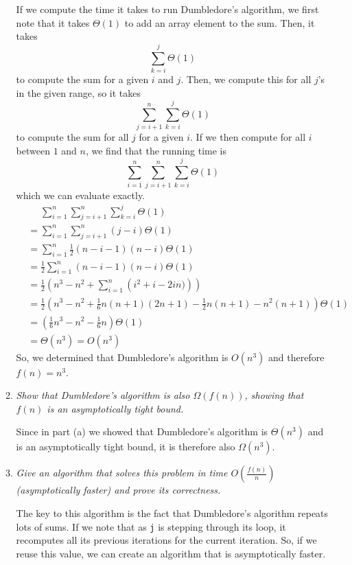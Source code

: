 \documentclass[12pt]{article}
\begin{document}
\begin{enumerate}
\begin{enumerate}
    If we compute the time it takes to run Dumbledore's algorithm, we first note that it takes $\Theta(1)$ to add an array element to the sum. Then, it takes
    \[
    \sum_{k=i}^{j} \Theta(1)
    \]
    to compute the sum for a given $i$ and $j$. Then, we compute this for all $j$'s in the given range, so it takes
    \[
    \sum_{j=i+1}^{n} \sum_{k=i}^{j} \Theta(1)
    \]
    to compute the sum for all $j$ for a given $i$. If we then compute for all $i$ between $1$ and $n$, we find that the running time is
    \[
    \sum_{i=1}^n \sum_{j=i+1}^{n} \sum_{k=i}^{j} \Theta(1)
    \]
    which we can evaluate exactly.
    \begin{align*}
        &\hspace{16pt}\sum_{i=1}^n \sum_{j=i+1}^{n} \sum_{k=i}^{j} \Theta(1)\\
        &= \sum_{i=1}^n \sum_{j=i+1}^{n} (j-i)\Theta(1)\\
        &= \sum_{i=1}^n \frac{1}{2}(n-i-1)(n-i) \Theta(1)\\
        &= \frac{1}{2} \sum_{i=1}^n (n-i-1)(n-i) \Theta(1)\\
        &= \frac{1}{2} \left( n^3 - n^2 + \sum_{i=1}^n \left(i^2+i-2in)\right)\right)\\
        &= \frac{1}{2} \left( n^3 - n^2 + \frac{1}{6}n(n+1)(2n+1)-\frac{1}{2}n(n+1) - n^2(n+1)\right) \Theta(1)\\
        &= \left(\frac{1}{6}n^3-n^2-\frac{1}{6}n\right)\Theta(1)\\
        &= \Theta(n^3) = O(n^3)
    \end{align*}
    So, we determined that Dumbledore's algorithm is $O(n^3)$ and therefore $\boxed{f(n)=n^3}$.
    
    
	\item \textit{Show that Dumbledore's algorithm is also $\Omega(f(n))$, showing that $f(n)$ is an asymptotically tight bound.}
	
	Since in part (a) we showed that Dumbledore's algorithm is $\Theta(n^3)$ and is an asymptotically tight bound, it is therefore also $\Omega(n^3)$.
	
	
	\item \textit{Give an algorithm that solves this problem in time $O\left(\frac{f(n)}{n}\right)$ (asymptotically faster) and prove its correctness.}
	
	The key to this algorithm is the fact that Dumbledore's algorithm repeats lots of sums. If we note that as \texttt{j} is stepping through its loop, it recomputes all its previous iterations for the current iteration. So, if 
we reuse this value, we can create an algorithm that is asymptotically faster.
	

\end{enumerate}
\end{enumerate}
\end{document}
